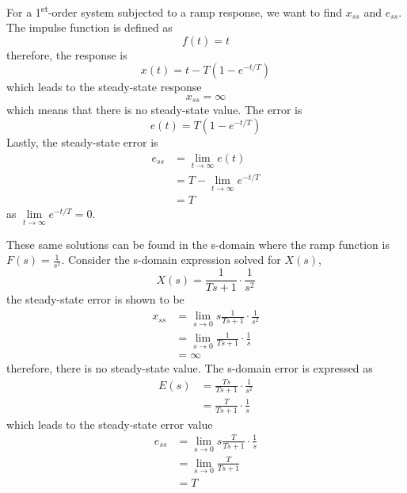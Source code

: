 \documentclass[12pt,letter]{article}
\begin{document}
For a 1\textsuperscript{st}-order system subjected to a ramp response, we want to find $x_{ss}$ and $e_{ss}$. The impulse function is defined as
\begin{equation}
f(t) = t
\end{equation}
therefore, the response is
\begin{equation}
x(t) = t - T(1-e^{-t/T})
\end{equation}
which leads to the steady-state response
\begin{equation}
x_{ss} =  \infty 
\end{equation}
which means that there is no steady-state value. The error is
\begin{equation}
e(t) = T(1-e^{-t/T})
\end{equation}
Lastly, the steady-state error is
\begin{align}
e_{ss} &= \lim\limits_{t \rightarrow \infty}e(t)  \\
&= T - \lim\limits_{t \rightarrow \infty}e^{-t/T} \nonumber \\
&= T \nonumber
\end{align}
as $\lim\limits_{t \rightarrow \infty}e^{-t/T} = 0$.

These same solutions can be found in the s-domain where the ramp function is $F(s)=\frac{1}{s^2}$. Consider the s-domain expression solved for $X(s)$, 
\begin{equation}
X(s) = \frac{1}{Ts +1} \cdot \frac{1}{s^2} 
\end{equation}
the steady-state error is shown to be
\begin{align}
x_{ss} &= \lim\limits_{s \rightarrow 0} s \frac{1}{Ts+1} \cdot \frac{1}{s^2} \\
&= \lim\limits_{s \rightarrow 0} \frac{1}{Ts+1} \cdot \frac{1}{s}  \nonumber \\
&= \infty    \nonumber 
\end{align}
therefore, there is no steady-state value. The s-domain error is expressed as
\begin{align}
E(s) &= \frac{Ts}{Ts +1} \cdot \frac{1}{s^2} \\
&= \frac{T}{Ts +1} \cdot \frac{1}{s}  \nonumber 
\end{align}
which leads to the steady-state error value
\begin{align}
e_{ss} &= \lim\limits_{s \rightarrow 0}  s \frac{T}{Ts+1} \cdot \frac{1}{s} \\
&= \lim\limits_{s \rightarrow 0}   \frac{T}{Ts+1} \nonumber \\
&= T   \nonumber 
\end{align}
\end{document}

